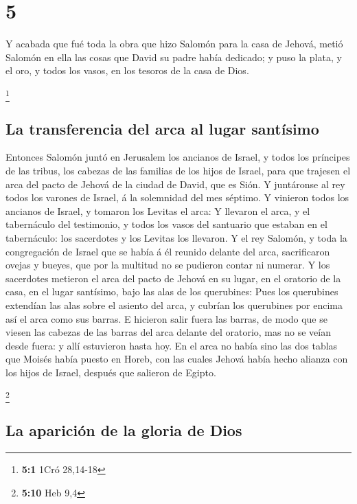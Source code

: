 \hypertarget{section-4}{%
\section{5}\label{section-4}}

 Y acabada que fué toda la obra que hizo Salomón para la
casa de Jehová, metió Salomón en ella las cosas que David su padre había
dedicado; y puso la plata, y el oro, y todos los vasos, en los tesoros
de la casa de Dios.

\footnote{\textbf{5:1} 1Cró 28,14-18}

\hypertarget{la-transferencia-del-arca-al-lugar-santuxedsimo}{%
\subsection{La transferencia del arca al lugar
santísimo}\label{la-transferencia-del-arca-al-lugar-santuxedsimo}}

 Entonces Salomón juntó en Jerusalem los ancianos de
Israel, y todos los príncipes de las tribus, los cabezas de las familias
de los hijos de Israel, para que trajesen el arca del pacto de Jehová de
la ciudad de David, que es Sión.  Y juntáronse al rey
todos los varones de Israel, á la solemnidad del mes séptimo.
 Y vinieron todos los ancianos de Israel, y tomaron los
Levitas el arca:  Y llevaron el arca, y el tabernáculo del
testimonio, y todos los vasos del santuario que estaban en el
tabernáculo: los sacerdotes y los Levitas los llevaron.  Y
el rey Salomón, y toda la congregación de Israel que se había á él
reunido delante del arca, sacrificaron ovejas y bueyes, que por la
multitud no se pudieron contar ni numerar.  Y los
sacerdotes metieron el arca del pacto de Jehová en su lugar, en el
oratorio de la casa, en el lugar santísimo, bajo las alas de los
querubines:  Pues los querubines extendían las alas sobre
el asiento del arca, y cubrían los querubines por encima así el arca
como sus barras.  E hicieron salir fuera las barras, de
modo que se viesen las cabezas de las barras del arca delante del
oratorio, mas no se veían desde fuera: y allí estuvieron hasta hoy.
 En el arca no había sino las dos tablas que Moisés había
puesto en Horeb, con las cuales Jehová había hecho alianza con los hijos
de Israel, después que salieron de Egipto.

\footnote{\textbf{5:10} Heb 9,4}

\hypertarget{la-apariciuxf3n-de-la-gloria-de-dios}{%
\subsection{La aparición de la gloria de
Dios}\label{la-apariciuxf3n-de-la-gloria-de-dios}}

